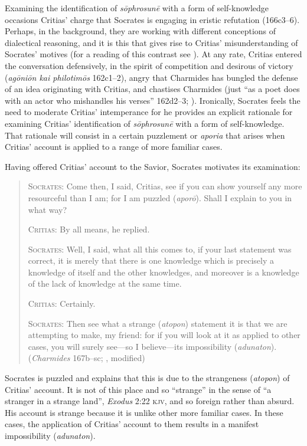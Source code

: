Examining the identification of \emph{sōphrosunē} with a form of self-knowledge occasions Critias' charge that Socrates is engaging in eristic refutation (166c3–6). Perhaps, in the background, they are working with different conceptions of dialectical reasoning, and it is this that gives rise to Critias' misunderstanding of Socrates' motives (for a reading of this contrast see \citealt[chapter 4]{Schmid:1998aa}). At any rate, Critias entered the conversation defensively, in the spirit of competition and desirous of victory (\emph{agōniōn kai philotimōs} 162c1–2), angry that Charmides has bungled the defense of an idea originating with Critias, and chastises Charmides (just ``as a poet does with an actor who mishandles his verses'' 162d2–3; \citealt[41]{Lamb:1927qw}). Ironically, Socrates feels the need to moderate Critias' intemperance for he provides an explicit rationale for examining Critias' identification of \emph{sōphrosunē} with a form of self-knowledge. That rationale will consist in a certain puzzlement or \emph{aporia} that arises when Critias' account is applied to a range of more familiar cases.

Having offered Critias' account to the Savior, Socrates motivates its examination:
\begin{quotation}
	\textsc{Socrates}: Come then, I said, Critias, see if you can show yourself any more resourceful than I am; for I am puzzled (\emph{aporō}). Shall I explain to you in what way?
	
	\textsc{Critias}: By all means, he replied.
	
	\textsc{Socrates}: Well, I said, what all this comes to, if your last statement was correct, it is merely that there is one knowledge which is precisely a knowledge of itself and the other knowledges, and moreover is a knowledge of the lack of knowledge at the same time.
	
	\textsc{Critias}: Certainly.
	
	\textsc{Socrates}: Then see what a strange (\emph{atopon}) statement it is that we are attempting to make, my friend: for if you will look at it as applied to other cases, you will surely see—so I believe—its impossibility (\emph{adunaton}). (\emph{Charmides} 167b–sc; \citealt[57]{Lamb:1927qw}, modified)
\end{quotation}

Socrates is puzzled and explains that this is due to the strangeness (\emph{atopon}) of  Critias' account. It is not of this place and so ``strange'' in the sense of ``a stranger in a strange land'', \emph{Exodus} 2:22 \textsc{kjv}, and so foreign rather than absurd. His account is strange because it is unlike other more familiar cases. In these cases, the application of Critias' account to them results in a manifest impossibility (\emph{adunaton}).

